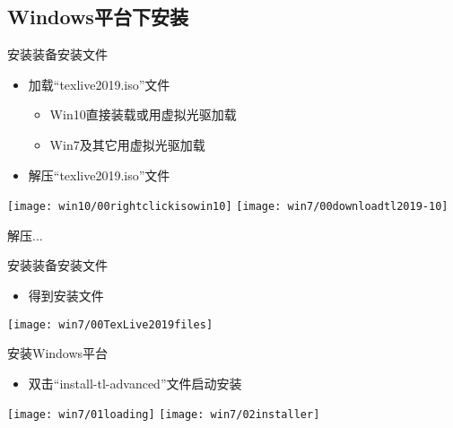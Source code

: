 \documentclass[fontset = none, t]{ctexbeamer}
\begin{document}
\subsection[Windows平台]{Windows平台下安装\tl}
\begin{frame}{安装\tl}{装备安装文件}
  \begin{spacing}{1.0}
    \begin{itemize}
    \item 加载\enquote{texlive2019.iso}文件
      \begin{itemize}
      \item Win10直接装载或用虚拟光驱加载
      \item Win7及其它用虚拟光驱加载
      \end{itemize}      
    \item 解压\enquote{texlive2019.iso}文件
    \end{itemize}
  \begin{center}
    \texttt{[image: win10/00rightclickisowin10]}
    \texttt{[image: win7/00downloadtl2019-10]}
  \end{center}
  \end{spacing}
\end{frame}

\begin{frame}
  解压...
\end{frame}

\begin{frame}{安装\tl}{装备安装文件}
  \begin{spacing}{1.0}
    \begin{itemize}
    \item 得到\alert{安装文件}
    \end{itemize}  
  \begin{center}    
    \texttt{[image: win7/00TexLive2019files]}
  \end{center}
  \end{spacing}
\end{frame}

\begin{frame}{安装\tl}{Windows平台}
  \begin{spacing}{1.0}
    \begin{itemize}
    \item 双击\enquote{install-tl-advanced}文件启动\TeXLive 安装
    \end{itemize}  
  \begin{center}    
    \texttt{[image: win7/01loading]}
    \texttt{[image: win7/02installer]}
  \end{center}
  \end{spacing}
\end{frame}
\end{document}
